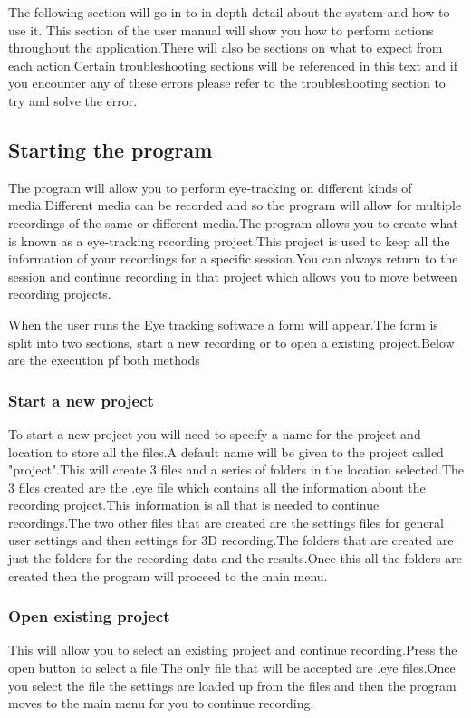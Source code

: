 The following section will go in to in depth detail about the system and how to use it. This section of the user manual will show you how to perform actions throughout the application.There will also be sections on what to expect from each action.Certain troubleshooting sections will be referenced in this text and if you encounter any of these errors please refer to the troubleshooting section to try and solve the error.

\subsection{Starting the program}
The program will allow you to perform eye-tracking on different kinds of media.Different media can be recorded and so the program will allow for multiple recordings of the same or different media.The program allows you to create what is known as a eye-tracking recording project.This project is used to keep all the information of your recordings for a specific session.You can always return to the session and continue recording in that project which allows you to move between recording projects.\newline

 When the user runs the Eye tracking software a form will appear.The form is split into two sections, start a new recording or to open a existing project.Below are the execution pf both methods

\subsubsection{Start a new project} 
To start a new project you will need to specify a name for the project and location to store all the files.A default name will be given to the project called "project".This will create 3 files and a series of folders in the location selected.The 3 files created are the .eye file which contains all the information about the recording project.This information is all that is needed to continue recordings.The two other files that are created are the settings files for general user settings and then settings for 3D recording.The folders that are created are just the folders for the recording data and the results.Once this all the folders are created then the program will proceed to the main menu.
\subsubsection{Open existing project} 
This will allow you to select an existing project and continue recording.Press the open button to select a file.The only file that will be accepted are .eye files.Once you select the file the settings are loaded up from the files and then the program moves to the main menu for you to continue recording.


